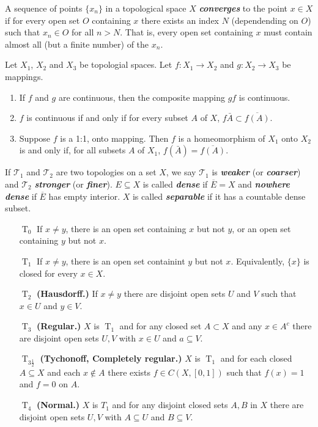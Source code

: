 \documentclass{article}
\theoremstyle{definition}
\numberwithin{equation}{section}
\begin{document}
	A sequence of points $\{x_n\}$ in a topological space $X$ \textbf{\textit{converges}} to the point $x\in X$ if for every open set $O$ containing $x$ there exists an index $N$ (dependending on $O$) such that $x_n\in O$ for all $n>N$. That is, every open set containing $x$ must contain almost all (but a finite number) of the $x_n$.
	
	\begin{prop} Let $X_1$, $X_2$ and $X_3$ be topologial spaces. Let $f:X_1\to X_2$ and $g:X_2\to X_3$ be mappings.
		\begin{enumerate} 
			\item If $f$ and $g$ are continuous, then the composite mapping $gf$ is continuous.
			\item $f$ is continuous if and only if for every subset $A$ of $X$, $f\bar{A}\subset\overline{f(A)}$.
			\item Suppose $f$ is a 1:1, onto mapping. Then $f$ is a homeomorphism of $X_1$ onto $X_2$ is and only if, for all subsets $A$ of $X_1$, $f(\bar{A})=\overline{f(A)}$.
		\end{enumerate}
	\end{prop}
	
	
	If $\mathcal{T}_1$ and $\mathcal{T}_2$ are two topologies on a set $X$, we say $\mathcal{T}_1$ is \textbf{\textit{weaker}} (or \textbf{\textit{coarser}}) and $\mathcal{T}_2$ \textbf{\textit{stronger}} (or \textbf{\textit{finer}}). $E\subseteq X$ is called \textbf{\textit{dense}} if $\overline{E}=X$ and \textbf{\textit{nowhere dense}} if $\overline{E}$ has empty interior. $X$ is called \textbf{\textit{separable}} if it has a countable dense subset. 
	
	\begin{enumerate}
		\item[$\operatorname{T}_0$] If $x\neq y$, there is an open set containing $x$ but not $y$, or an open set containing $y$ but not $x$.
		\item[$\operatorname{T}_1$] If $x\neq y$, there is an open set containint $y$ but not $x$. Equivalently, $\{x\}$ is closed for every $x\in X$.
		\item[$\operatorname{T}_2$] \textbf{(Hausdorff.)} If $x\neq y$ there are disjoint open sets $U$ and $V$ such that $x\in U$ and $y\in V$.
		\item[$\operatorname{T}_3$] \textbf{(Regular.)} $X$ is $\operatorname{T}_1$ and for any closed set $A\subset X$ and any $x\in A^c$ there are disjoint open sets $U,V$ with $x\in U$ and $a\subseteq V$.
		\item[$\operatorname{T}_{3\frac{1}{2}}$] \textbf{(Tychonoff, Completely regular.)} $X$ is $\operatorname{T}_1$ and for each closed $A\subseteq X$ and each $x\notin A$ there exists $f\in C(X,[0,1])$ such that $f(x)=1$ and $f=0$ on $A$.
		\item[$\operatorname{T}_4$] \textbf{(Normal.)} $X$ is $T_1$ and for any disjoint closed sets $A,B$ in $X$ there are disjoint open sets $U,V$ with $A\subseteq U$ and $B\subseteq V$.
	\end{enumerate}
	
\end{document}
